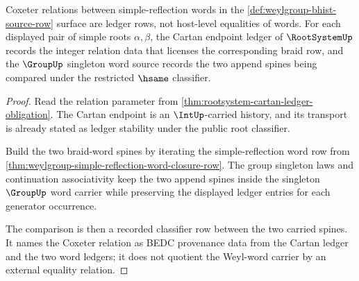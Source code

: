 \begin{theorem}
\label{thm:weylgroup-coxeter-word-ledger-row}
Coxeter relations between simple-reflection words in the
\autoref{def:weylgroup-bhist-source-row} surface are ledger rows, not
host-level equalities of words. For each displayed pair of simple roots
$\alpha,\beta$, the Cartan endpoint ledger of $\RootSystemUp$ records the
integer relation data that licenses the corresponding braid row, and the
$\GroupUp$ singleton word source records the two append spines being compared
under the restricted $\hsame$ classifier.
\end{theorem}
\begin{proof}
Read the relation parameter from
\autoref{thm:rootsystem-cartan-ledger-obligation}. The Cartan endpoint is an
$\IntUp$-carried history, and its transport is already stated as ledger
stability under the public root classifier.

Build the two braid-word spines by iterating the simple-reflection word row
from \autoref{thm:weylgroup-simple-reflection-word-closure-row}. The group
singleton laws and continuation associativity keep the two append spines
inside the singleton $\GroupUp$ word carrier while preserving the displayed
ledger entries for each generator occurrence.

The comparison is then a recorded classifier row between the two carried
spines. It names the Coxeter relation as BEDC provenance data from the Cartan
ledger and the two word ledgers; it does not quotient the Weyl-word carrier by
an external equality relation.
\end{proof}

